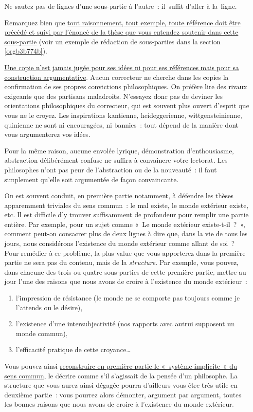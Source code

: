 \documentclass[a4paper,12pt]{report}
\begin{document}
Ne sautez pas de lignes d'une sous-partie à l'autre : il suffit d'aller
à la ligne.

Remarquez bien que \uline{tout raisonnement, tout exemple, toute référence
doit être précédé et suivi par l'énoncé de la thèse que vous entendez
soutenir dans cette sous-partie} (voir un exemple de rédaction de
sous-parties dans la section \ref{orgb3b774b}).

\uline{Une copie n'est jamais jugée pour ses idées ni pour ses références mais
pour sa construction argumentative}. Aucun correcteur ne cherche dans
les copies la confirmation de ses propres convictions philosophiques. On
préfère lire des rivaux exigeants que des partisans maladroits.
N'essayez donc pas de deviner les orientations philosophiques du
correcteur, qui est souvent plus ouvert d'esprit que vous ne le croyez.
Les inspirations kantienne, heideggerienne, wittgensteinienne, quinienne
ne sont ni encouragées, ni bannies : tout dépend de la manière dont vous
argumenterez vos idées.

Pour la même raison, aucune envolée lyrique, démonstration
d'enthousiasme, abstraction délibérément confuse ne suffira à convaincre
votre lectorat. Les philosophes n'ont pas peur de l'abstraction ou de la
nouveauté : il faut simplement qu'elle soit argumentée de façon
convaincante.

On est souvent conduit, en première partie notamment, à défendre les
thèses apparemment triviales du sens commun : le mal existe, le monde
extérieur existe, etc. Il est difficile d'y trouver suffisamment de
profondeur pour remplir une partie entière. Par exemple, pour un sujet
comme « Le monde extérieur existe-t-il ? », comment peut-on consacrer
plus de deux lignes à dire que, dans la vie de tous les jours, nous
considérons l'existence du monde extérieur comme allant de soi ?
Pour remédier à ce problème, la plus-value que vous apporterez dans la
première partie ne sera pas du contenu, mais de la \emph{structure}. Par
exemple, vous pouvez, dans chacune des trois ou quatre sous-parties de
cette première partie, mettre au jour l'une des raisons que nous avons
de croire à l'existence du monde extérieur :
\begin{enumerate}
\item l'impression de résistance (le monde ne se comporte pas toujours
comme je l'attends ou le désire),
\item l'existence d'une intersubjectivité (nos rapports avec autrui
supposent un monde commun),
\item l'efficacité pratique de cette croyance\ldots{}
\end{enumerate}
Vous pouvez ainsi \uline{reconstruire en première partie le « système
implicite » du sens commun}, le décrire comme s'il s'agissait de la
pensée d'un philosophe. La structure que vous aurez ainsi dégagée pourra
d'ailleurs vous être très utile en deuxième partie : vous pourrez alors
démonter, argument par argument, toutes les bonnes raisons que nous
avons de croire à l'existence du monde extérieur.
\end{document}

